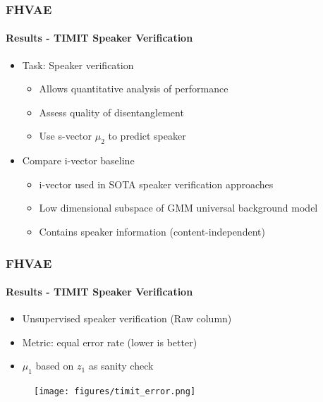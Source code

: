 \documentclass[9pt]{beamer}
\begin{document}
\begin{frame}
\frametitle{FHVAE}
\framesubtitle{Results - TIMIT Speaker Verification} %
\begin{itemize}
	\item Task: Speaker verification
	\begin{itemize}
		\item Allows quantitative analysis of performance
		\item Assess quality of disentanglement
		\item Use s-vector $\mu_2$ to predict speaker
	\end{itemize}
	\item Compare i-vector baseline
	\begin{itemize}
		\item i-vector used in SOTA speaker verification approaches
		\item Low dimensional subspace of GMM universal background model
		\item Contains speaker information (content-independent)
	\end{itemize}
\end{itemize}
\end{frame} 


\begin{frame}
\frametitle{FHVAE}
\framesubtitle{Results - TIMIT Speaker Verification} %
\begin{itemize}
	\item Unsupervised speaker verification (Raw column)
	\item Metric: equal error rate (lower is better)
	\item $\mu_1$ based on $z_1$ as sanity check
\end{itemize}
\begin{figure}
	\texttt{[image: figures/timit\_error.png]}
\end{figure}
\end{frame} 
\end{document}
